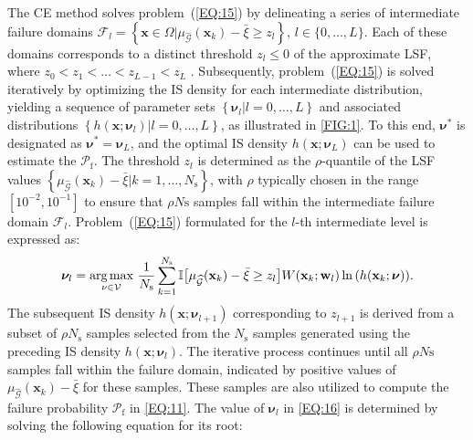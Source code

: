 \documentclass[preprint,3p]{elsarticle}
\begin{document}
\begin{linenumbers}
The CE method solves problem~(\ref{EQ:15}) by delineating a series of intermediate failure domains $\mathcal{F}_l=
\left\{\textbf{x} \in \Omega|\mu_{\widehat{\mathcal{G}}}(\textbf{x}_k) - \bar\xi \geq z_l \right\}$, $l \in \{0,\dots,L\}$.
Each of these domains corresponds to a distinct threshold $z_l\leq 0$ of the approximate LSF, where $z_0 < z_1 <…< z_{L-1} < z_L$ \cite{EHRE2021}.
Subsequently, problem~(\ref{EQ:15}) is solved iteratively by optimizing the IS density for each intermediate distribution, yielding a sequence of parameter sets $\left\{\boldsymbol{\nu}_l|l=0,\dots, L\right\}$ and associated distributions $\left\{h\left(\textbf{x};\boldsymbol{\nu}_l\right)|l=0,\dots, L\right\}$, as illustrated in \cref{FIG:1}.
To this end, $\boldsymbol{\nu}^{*}$  is designated as $\boldsymbol{\nu}^{*} = \boldsymbol{\nu}_L$, and the optimal IS density ${h}\left(\textbf{x};\boldsymbol{\nu}_L\right)$ can be used to estimate the $\mathcal{P}_\mathrm f$.
The threshold $z_l$ is determined as the $\rho$-quantile of the LSF values $\left\{\mu_{\widehat{\mathcal{G}}}(\textbf{x}_k) - \bar\xi|k=1,\dots, N_\text{s}\right\}$, with $\rho$ typically chosen in the range $[10^{-2}, 10^{-1}]$ to ensure that $\rho N\text{s}$ samples fall within the intermediate failure domain $\mathcal{F}_l$. Problem~(\ref{EQ:15}) formulated for the $l$-th intermediate level is expressed as: 
\begin{equation}
\boldsymbol{\nu}_l = \underset{\mathrm\nu \in \mathcal{V}}{\text{arg\,max}}\ 
    \frac{1}{N_\text{s}}\displaystyle\sum_{k=1}^{N_\text{s}}{\mathbb{I}\bigr[\mu_{\widehat{\mathcal{G}}}(\textbf{x}_k) - \bar\xi \geq z_l \bigl]W(\textbf{x}_k;{\bf w}_{l})\ln\left(h(\mathbf{x}_k;\boldsymbol{\nu})\right)}.
\label{EQ:16}
\end{equation}
The subsequent IS density ${h}\left(\textbf{x};\boldsymbol{\nu}_{l+1}\right)$ corresponding to $z_{l+1}$ is derived from a subset of $\rho N_\text{s}$ samples selected from the $N_\text{s}$ samples generated using the preceding IS density ${h}\left(\textbf{x};\boldsymbol{\nu}_{l}\right)$.
The iterative process continues until all $\rho N\text{s}$ samples fall within the failure domain, indicated by positive values of $\mu_{\widehat{\mathcal{G}}}(\textbf{x}_k) - \bar\xi$ for these samples. These samples are also utilized to compute the failure probability $\mathcal{P}_\mathrm f$ in \cref{EQ:11}. The value of $\boldsymbol{\nu}_l$ in \cref{EQ:16} is determined by solving the following equation for its root:
\begin{equation}

\end{equation}
\end{linenumbers}
\end{document}
